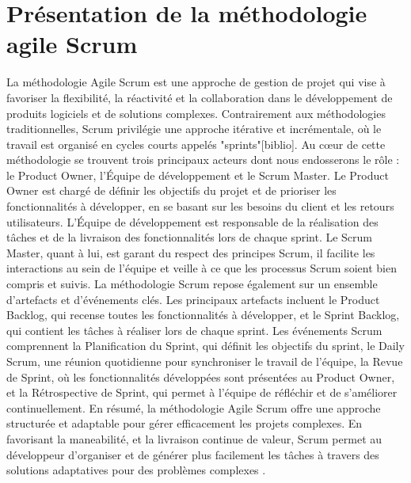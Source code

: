 \section{Présentation de la méthodologie agile Scrum}
La méthodologie Agile Scrum est une approche de gestion de projet qui vise à favoriser la flexibilité, la réactivité et la collaboration dans le développement de produits logiciels et de solutions complexes. Contrairement aux méthodologies traditionnelles, Scrum privilégie une approche itérative et incrémentale, où le travail est organisé en cycles courts appelés "sprints"[biblio].
	Au cœur de cette méthodologie se trouvent trois principaux acteurs dont nous endosserons le rôle : le Product Owner, l'Équipe de développement et le Scrum Master. Le Product Owner est chargé de définir les objectifs du projet et de prioriser les fonctionnalités à développer, en se basant sur les besoins du client et les retours utilisateurs. L'Équipe de développement est responsable de la réalisation des tâches et de la livraison des fonctionnalités lors de chaque sprint. Le Scrum Master, quant à lui, est garant du respect des principes Scrum, il facilite les interactions au sein de l'équipe et veille à ce que les processus Scrum soient bien compris et suivis.
La méthodologie Scrum repose également sur un ensemble d'artefacts et d'événements clés. Les principaux artefacts incluent le Product Backlog, qui recense toutes les fonctionnalités à développer, et le Sprint Backlog, qui contient les tâches à réaliser lors de chaque sprint. Les événements Scrum comprennent la Planification du Sprint, qui définit les objectifs du sprint, le Daily Scrum, une réunion quotidienne pour synchroniser le travail de l'équipe, la Revue de Sprint, où les fonctionnalités développées sont présentées au Product Owner, et la Rétrospective de Sprint, qui permet à l'équipe de réfléchir et de s'améliorer continuellement.
En résumé, la méthodologie Agile Scrum offre une approche structurée et adaptable pour gérer efficacement les projets complexes. En favorisant la maneabilité, et la livraison continue de valeur, Scrum permet au développeur d'organiser et de générer plus facilement les tâches à travers des solutions adaptatives pour des problèmes complexes \cite{schwaber2011scrum}.
	
